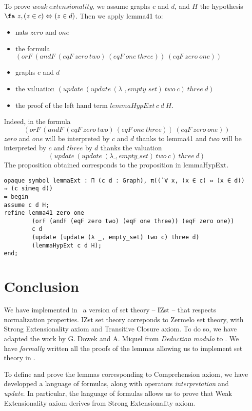\documentclass[a4paper]{article}
\begin{document}
To prove $weak \ extensionality$, we assume graphs $c$ and $d$, and $H$ the hypothesis $\fa~z, (z \in c) \Leftrightarrow (z \in d)$. Then we apply lemma41 to:

\begin{itemize}
\item nats $zero$ and $one$
\item the formula $(orF~(andF~(eqF~zero~two)~(eqF~one~three))~(eqF~zero~one))$
\item graphs $c$ and $d$
\item the valuation $(update~(update~(\lambda \_, empty\_set)~two~c)~three~d)$ 
\item the proof of the left hand term $lemmaHypExt~c~d~H$.
\end{itemize}

Indeed, in the formula $$(orF~(andF~(eqF~zero~two)~(eqF~one~three))~(eqF~zero~one))$$ $zero$ and $one$ will be interpreted by $c$ and $d$ thanks to lemma41 and $two$ will be interpreted by $c$ and $three$ by $d$ thanks the valuation $$(update~(update~(\lambda \_, empty\_set)~two~c)~three~d)$$ The proposition obtained corresponds to the proposition in lemmaHypExt.


\begin{lstlisting}
opaque symbol lemmaExt : Π (c d : Graph), π((`∀ x, (x ∈ c) ⇔ (x ∈ d)) ⇒ (c simeq d))
≔ begin
assume c d H;
refine lemma41 zero one 
		(orF (andF (eqF zero two) (eqF one three)) (eqF zero one)) 
		c d 
		(update (update (λ _, empty_set) two c) three d) 
		(lemmaHypExt c d H);
end;
\end{lstlisting}

\section{Conclusion}

We have implemented in \dedukti ~a version of set theory -- IZst -- that respects normalization properties. IZst set theory correponds to Zermelo set theory, with Strong Extensionality axiom and Transitive Closure axiom. To do so, we have adapted the work by G. Dowek and A. Miquel \cite{zermodulo} from \textit{Deduction modulo} to \lpcm. We have \textit{formally} written all the proofs of the lemmas allowing us to implement set theory in \dedukti.


To define and prove the lemmas corresponding to Comprehension axiom, we have developped a language of formulas, along with operators \textit{interpretation} and \textit{update}. In particular, the language of formulas allows us to prove that Weak Extensionality axiom derives from Strong Extensionality axiom.
\end{document}
